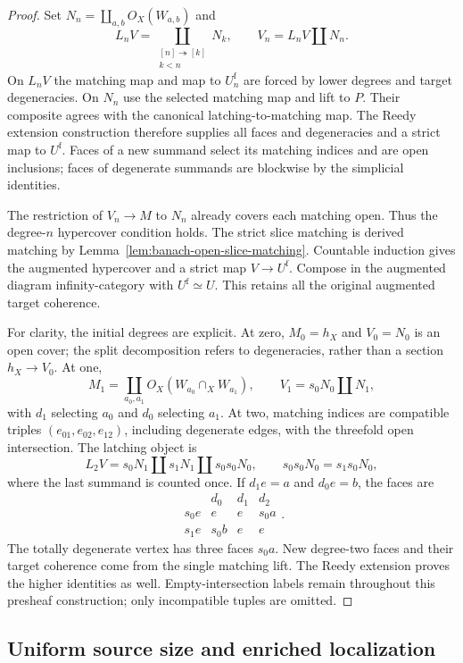 \documentclass[12pt]{amsart}
\theoremstyle{definition}
\theoremstyle{remark}
\numberwithin{equation}{section}
\begin{document}
\begin{proof}
Set $N_n=\coprod_{a,b}O_X(W_{a,b})$ and
\[
 L_nV=\coprod_{\substack{[n]\twoheadrightarrow[k]\\k<n}}N_k,
 \qquad V_n=L_nV\amalg N_n.
\]
On $L_nV$ the matching map and map to $U^{\mathrm f}_n$
are forced by lower degrees and target degeneracies.
On $N_n$ use the selected matching map and lift to
$P$. Their composite agrees with the canonical
latching-to-matching map. The Reedy extension
construction therefore supplies all faces and
degeneracies and a strict map to $U^{\mathrm f}$.
Faces of a new summand select its matching indices
and are open inclusions; faces of degenerate
summands are blockwise by the simplicial identities.

The restriction of $V_n\to M$ to $N_n$ already
covers each matching open. Thus the degree-$n$
hypercover condition holds. The strict slice
matching is derived matching by
Lemma~\ref{lem:banach-open-slice-matching}.
Countable induction gives the augmented hypercover
and a strict map $V\to U^{\mathrm f}$.
Compose in the augmented diagram infinity-category
with $U^{\mathrm f}\simeq U$. This retains all the
original augmented target coherence.

For clarity, the initial degrees are explicit.
At zero, $M_0=h_X$ and $V_0=N_0$ is an open cover;
the split decomposition refers to degeneracies,
rather than a section $h_X\to V_0$. At one,
\[
 M_1=\coprod_{a_0,a_1}
 O_X(W_{a_0}\cap_XW_{a_1}),\qquad
 V_1=s_0N_0\amalg N_1,
\]
with $d_1$ selecting $a_0$ and $d_0$ selecting $a_1$.
At two, matching indices are compatible triples
$(e_{01},e_{02},e_{12})$, including degenerate edges,
with the threefold open intersection. The latching
object is
\[
 L_2V=s_0N_1\amalg s_1N_1\amalg s_0s_0N_0,
 \qquad s_0s_0N_0=s_1s_0N_0,
\]
where the last summand is counted once. If
$d_1e=a$ and $d_0e=b$, the faces are
\[
 \begin{array}{c|ccc}
       &d_0&d_1&d_2\\ \hline
 s_0e  &e&e&s_0a\\
 s_1e  &s_0b&e&e
 \end{array}.
\]
The totally degenerate vertex has three faces $s_0a$.
New degree-two faces and their target coherence
come from the single matching lift. The Reedy
extension proves the higher identities as well.
Empty-intersection labels remain throughout this
presheaf construction; only incompatible tuples
are omitted.
\end{proof}

\subsection{Uniform source size and enriched localization}
\end{document}
